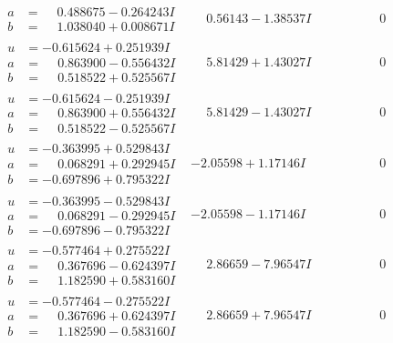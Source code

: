 \documentclass[1p]{elsarticle_modified}
\theoremstyle{definition}
\begin{document}
$$\begin{array}{c|c|c}
\begin{aligned}
a &= \phantom{-}0.488675 - 0.264243 I \\
b &= \phantom{-}1.038040 + 0.008671 I\end{aligned}
 & \phantom{-}0.56143 - 1.38537 I & \phantom{-0.000000 } 0 \\ \hline\begin{aligned}
u &= -0.615624 + 0.251939 I \\
a &= \phantom{-}0.863900 - 0.556432 I \\
b &= \phantom{-}0.518522 + 0.525567 I\end{aligned}
 & \phantom{-}5.81429 + 1.43027 I & \phantom{-0.000000 } 0 \\ \hline\begin{aligned}
u &= -0.615624 - 0.251939 I \\
a &= \phantom{-}0.863900 + 0.556432 I \\
b &= \phantom{-}0.518522 - 0.525567 I\end{aligned}
 & \phantom{-}5.81429 - 1.43027 I & \phantom{-0.000000 } 0 \\ \hline\begin{aligned}
u &= -0.363995 + 0.529843 I \\
a &= \phantom{-}0.068291 + 0.292945 I \\
b &= -0.697896 + 0.795322 I\end{aligned}
 & -2.05598 + 1.17146 I & \phantom{-0.000000 } 0 \\ \hline\begin{aligned}
u &= -0.363995 - 0.529843 I \\
a &= \phantom{-}0.068291 - 0.292945 I \\
b &= -0.697896 - 0.795322 I\end{aligned}
 & -2.05598 - 1.17146 I & \phantom{-0.000000 } 0 \\ \hline\begin{aligned}
u &= -0.577464 + 0.275522 I \\
a &= \phantom{-}0.367696 - 0.624397 I \\
b &= \phantom{-}1.182590 + 0.583160 I\end{aligned}
 & \phantom{-}2.86659 - 7.96547 I & \phantom{-0.000000 } 0 \\ \hline\begin{aligned}
u &= -0.577464 - 0.275522 I \\
a &= \phantom{-}0.367696 + 0.624397 I \\
b &= \phantom{-}1.182590 - 0.583160 I\end{aligned}
 & \phantom{-}2.86659 + 7.96547 I & \phantom{-0.000000 } 0\\

\end{array}$$
\end{document}
